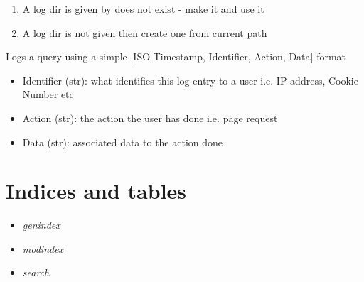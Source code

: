 \documentclass[letterpaper,10pt,english]{sphinxmanual}
\begin{document}
\begin{fulllineitems}
\begin{fulllineitems}
\begin{enumerate}
\item {} 
A log dir is given by does not exist - make it and use it

\item {} 
A log dir is not given then create one from current path

\end{enumerate}

\end{fulllineitems}


\begin{fulllineitems}
\label{api2.0:puppy.logging.EventLogger.log}
Logs a query using a simple {[}ISO Timestamp, Identifier, Action, Data{]} format
\begin{itemize}
\item {} 
Identifier (str): what identifies this log entry to a user i.e. IP address, Cookie Number etc

\item {} 
Action (str): the action the user has done i.e. page request

\item {} 
Data (str): associated data to the action done

\end{itemize}

\end{fulllineitems}


\end{fulllineitems}



\chapter{Indices and tables}
\label{index:indices-and-tables}\begin{itemize}
\item {} 
\emph{genindex}

\item {} 
\emph{modindex}

\item {} 
\emph{search}

\end{itemize}
\end{document}
